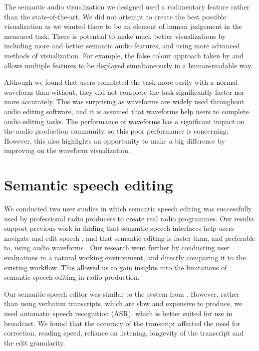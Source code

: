 The semantic audio visualization we designed used a rudimentary feature rather than the state-of-the-art.  We did not
attempt to create the best possible visualization as we wanted there to be an element of human judgement in the
measured task. There is potential to make much better visualizations by including more and better semantic audio
features, and using more advanced methods of visualization. For example, the false colour approach taken by
\citet{Tzanetakis2000} and \citet{Mason2007} allows multiple features to be displayed simultaneously in a
human-readable way.

Although we found that users completed the task more easily with a normal waveform than without, they did not complete
the task significantly faster nor more accurately. This was surprising as waveforms are widely used throughout audio
editing software, and it is assumed that waveforms help users to complete audio editing tasks. The performance of
waveforms has a significant impact on the audio production community, so this poor performance is concerning. However,
this also highlights an opportunity to make a big difference by improving on the waveform visualization.

\section{Semantic speech editing}

We conducted two user studies in which semantic speech editing was successfully used by professional radio producers to
create real radio programmes. Our results support previous work in finding that semantic speech interfaces help users
navigate and edit speech \citep{Whittaker2002}, and that semantic editing is faster than, and preferable to, using
audio waveforms \citep{Whittaker2004,Sivaraman2016}. Our research went further by conducting user evaluations in a
natural working environment, and directly comparing it to the existing workflow. This allowed us to gain insights into
the limitations of semantic speech editing in radio production.

Our semantic speech editor was similar to the system from \citet{Rubin2013}. However, rather than using verbatim
transcripts, which are slow and expensive to produce, we used automatic speech recognition (ASR), which is better
suited for use in broadcast.  We found that the accuracy of the transcript affected the need for correction, 
reading speed, reliance on listening, longevity of the transcript and the edit granularity.

